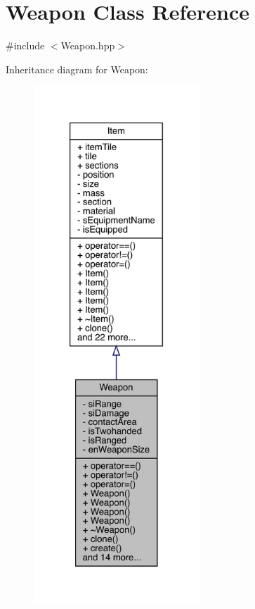 \hypertarget{class_weapon}{}\section{Weapon Class Reference}
\label{class_weapon}


{\ttfamily \#include $<$Weapon.\+hpp$>$}



Inheritance diagram for Weapon\+:
\nopagebreak
\begin{figure}[H]
\begin{center}
\leavevmode
\includegraphics[height=550pt]{class_weapon__inherit__graph}
\end{center}
\end{figure}


